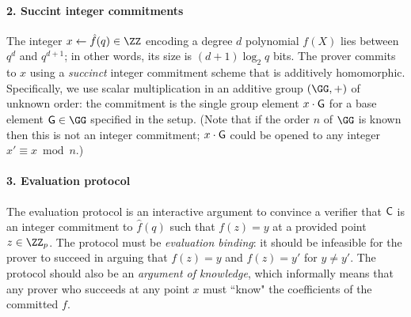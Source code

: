 \paragraph{2. Succint integer commitments}
The integer $x \leftarrow \hat{f}(q) \in \ZZ$ encoding a degree $d$ polynomial $f(X)$ lies between $q^d$ and $q^{d+1}$; in other words, its size is $(d+1) \log_2 q$ bits. The prover commits to $x$ using a \emph{succinct} integer commitment scheme that is additively homomorphic. Specifically, we use scalar multiplication in an additive group $(\GG,+)$ of unknown order: the commitment is the single group element $x\cdot \gr{g}$ for a base element $\gr{g} \in \GG$ specified in the setup. (Note that if the order $n$ of $\GG$ is known then this is not an integer commitment; $x\cdot \gr{g}$ could be opened to any integer $x' \equiv x \bmod n$.)

\begin{comment} 
The binary representation of this integer consists of $d\cdot \log_2(q)$ bits, which is about as large as the description of the polynomial itself. We therefore need a succinct cryptographic commitment\footnote{For now, we consider binding-only commitments which do not hide the committed value.} of the integer that preserves the homomorphic properties of the polynomial encoding. For this purpose we use exponentiation in a group of unknown order: $\ZZ \rightarrow \mathbb{G}, x \mapsto \gr{C} = \gr{g}^x$ for some random but fixed group element $\gr{g}$. As the order is unknown in these groups, the prover cannot reduce $x\in\ZZ$ and cannot learn a different integer discrete logarithm between $\gr{g}$ and $\gr{C}$. 
The commitment is succinct as the size of group elements in $\GG$ such as $\gr{g}^x$ is just determined by a security parameter.
This commitment function is also homomorphic, \emph{i.e.}, $\gr{g}^x\cdot \gr{g}^y=\gr{g}^{x+y}$, and thus preserves the homomorphic properties of the integer encoding of polynomials.
\end{comment}

\paragraph{3. Evaluation protocol}
The evaluation protocol is an interactive argument to convince a verifier that $\gr{C}$ is an integer commitment to $\hat{f}(q)$ such that $f(z) = y$ at a provided point $z \in \ZZ_p$. The protocol must be \emph{evaluation binding}: it should be infeasible for the prover to succeed in arguing that $f(z) = y$ and $f(z) = y'$ for $y \neq y'$. The protocol should also be an \emph{argument of knowledge}, which informally means that any prover who succeeds at any point $x$ must ``know" the coefficients of the committed $f$. 


